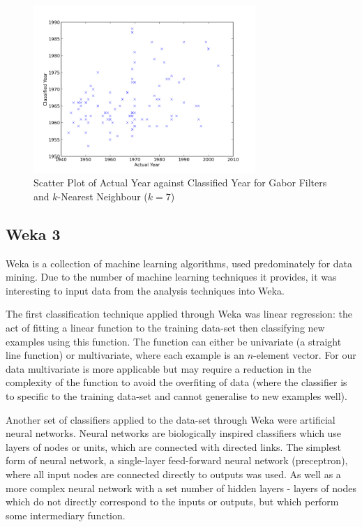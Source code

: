 \begin{figure}[h]
\centering
\includegraphics[width=0.75\textwidth]{img/scatter.png}
\caption{Scatter Plot of Actual Year against Classified Year for Gabor Filters and $k$-Nearest 
Neighbour ($k=7$)}\label{fig:scatter}
\end{figure}

\subsection{Weka 3}
Weka is a collection of machine learning algorithms\cite{Hall2009WEKA}, used predominately for
data mining. Due to the number of machine learning techniques it provides, it was interesting to
input data from the analysis techniques into Weka.

The first classification technique applied through Weka was linear 
regression\cite[p.717-727]{Russell2010Artificial}: the act of fitting a linear function to the 
training data-set then classifying new examples using this function. The function can either be
univariate (a straight line function) or multivariate, where each example is an $n$-element 
vector. For our data multivariate is more applicable but may require a reduction in the complexity
of the function to avoid the overfiting of data (where the classifier is to specific to the 
training data-set and cannot generalise to new examples well).

Another set of classifiers applied to the data-set through Weka were artificial neural 
networks\cite[p.727-737]{Russell2010Artificial}. Neural networks are biologically inspired 
classifiers which use layers of nodes or units, which are connected with directed links. The 
simplest form of neural network, a single-layer feed-forward neural network (preceptron), where
all input nodes are connected directly to outputs was used. As well as a more complex neural 
network with a set number of hidden layers - layers of nodes which do not directly correspond to
the inputs or outputs, but which perform some intermediary function.

